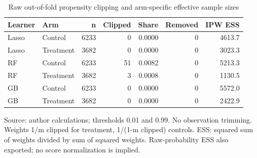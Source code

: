 \begin{table}[htbp]
\centering
\footnotesize
\caption{Raw out-of-fold propensity clipping and arm-specific effective sample sizes}
\begin{tabularx}{\linewidth}{Xlrrrrr}
\toprule
Learner & Arm & n & Clipped & Share & Removed & IPW ESS \\
\midrule
Lasso & Control & 6233 & 0 & 0.0000 & 0 & 4613.7 \\
Lasso & Treatment & 3682 & 0 & 0.0000 & 0 & 3023.3 \\
RF & Control & 6233 & 51 & 0.0082 & 0 & 5213.3 \\
RF & Treatment & 3682 & 3 & 0.0008 & 0 & 1130.5 \\
GB & Control & 6233 & 0 & 0.0000 & 0 & 5572.0 \\
GB & Treatment & 3682 & 0 & 0.0000 & 0 & 2422.9 \\
\bottomrule
\end{tabularx}
\par\vspace{3pt}\begin{minipage}{\linewidth}\footnotesize Source: author calculations; thresholds 0.\allowbreak{}01 and 0.\allowbreak{}99.\allowbreak{} No observation trimming.\allowbreak{} Weights 1/m clipped for treatment, 1/(1-m clipped) controls.\allowbreak{} ESS: squared sum of weights divided by sum of squared weights.\allowbreak{} Raw-probability ESS also exported; no score normalization is implied.\allowbreak{}\end{minipage}
\end{table}
